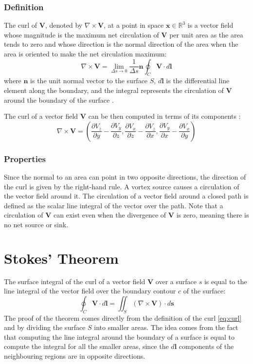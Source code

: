 \subsubsection{Definition}
The curl of \(\mathbf{V}\), denoted by \(\nabla \times \mathbf{V}\), at a point in 
space \(\mathbf{x} \in \mathbb{R}^3\) is a vector field whose magnitude is the 
maximum net circulation of \(\mathbf{V}\) per unit area as the area tends to zero 
and whose direction is the normal direction of the area when the area is oriented 
to make the net circulation maximum:
\begin{equation}
\nabla \times \mathbf{V} = \lim_{\Delta s \to 0} \frac{1}{\Delta s} \mathbf{n} 
\oint_{C} \mathbf{V} \cdot d\mathbf{l}
\label{eq:curl}
\end{equation}
where \(\mathbf{n}\) is the unit normal vector to the surface \(S\), \(d\mathbf{l}\) 
is the differential line element along the boundary, and the integral represents 
the circulation of \(\mathbf{V}\) around the boundary of the surface 
\cite{book-magnetism}.

The curl of a vector field \(\mathbf{V}\) can be then computed in terms of its 
components \cite{math-book}:
\begin{equation}
\nabla \times \mathbf{V} = \left( \frac{\partial V_z}{\partial y} - \frac{\partial 
V_y}{\partial z}, \frac{\partial V_x}{\partial z} - \frac{\partial V_z}{\partial 
x}, \frac{\partial V_y}{\partial x} - \frac{\partial V_x}{\partial y} \right)
\label{eq:curl_calculation}
\end{equation}

\subsubsection{Properties}
Since the normal to an area can point in two opposite directions, the direction 
of the curl is given by the right-hand rule.
A vortex source causes a circulation of the vector field around it. The 
circulation of a vector field around a closed path is defined as the scalar line 
integral of the vector over the path. Note that a circulation of \(\mathbf{V}\) 
can exist even when the divergence of \(\mathbf{V}\) is zero, meaning there is no 
net source or sink.

\section{Stokes' Theorem} \label{Stokes' Theorem}
The surface integral of the curl of a vector field \(\mathbf{V}\) over a surface 
\( s \) is equal to the line integral of the vector field over the boundary 
contour \( c \) of the surface:
\begin{equation}
\oint_C \mathbf{V} \cdot d\mathbf{l} = \iint_S (\nabla \times \mathbf{V}) \cdot 
d\mathbf{s}
\label{eq:stokes}
\end{equation}
The proof of the theorem comes directly from the definition of the curl 
\ref{eq:curl} and by dividing the surface $S$ into smaller areas. The idea comes 
from the fact that computing the line integral around the boundary of a surface 
is equal to compute the integral for all the smaller areas, since the 
\(d\mathbf{l}\) components of the neighbouring regions are in opposite 
directions.

